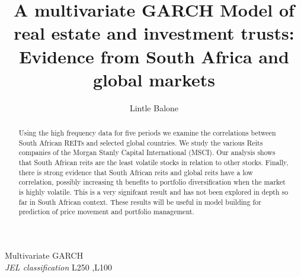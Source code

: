 \documentclass[11pt,preprint, authoryear]{elsarticle}
\numberwithin{equation}{section}
\numberwithin{figure}{section}
\numberwithin{table}{section}
\begin{document}
\begin{frontmatter}  %

\title{A multivariate GARCH Model of real estate and investment trusts:
Evidence from South Africa and global markets}





\author[Add1]{Lintle Balone}





\address[Add1]{Department of Economics, Stellenbosch University, Cape Town, South
Africa}


\begin{abstract}
\small{
Using the high frequency data for five periods we examine the
correlations between South African REITs and selected global countries.
We study the various Reits companies of the Morgan Stanly Capital
International (MSCI). Our analysis shows that South African reits are
the least volatile stocks in relation to other stocks. Finally, there is
strong evidence that South African reits and global reits have a low
correlation, possibly increasing th benefits to portfolio
diversification when the market is highly volatile. This is a very
signifcant result and has not been explored in depth so far in South
African context. These results will be useful in model building for
prediction of price movement and portfolio management.
}
\end{abstract}

\vspace{1cm}

\begin{keyword}
\footnotesize{
Multivariate GARCH \\ \vspace{0.3cm}
\textit{JEL classification} L250 \sep L100
}
\end{keyword}
\vspace{0.5cm}
\end{frontmatter}



\pagestyle{fancy}
\chead{}
\rhead{}
\lfoot{}
\lhead{}
\cfoot{}

\end{document}

